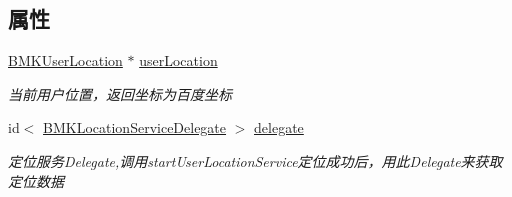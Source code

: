\subsection*{属性}
\begin{DoxyCompactItemize}
\item 
\hypertarget{interface_b_m_k_location_service_a19c6477dc79e94c8e20d7ddf1e52b0c2}{\hyperlink{interface_b_m_k_user_location}{B\+M\+K\+User\+Location} $\ast$ \hyperlink{interface_b_m_k_location_service_a19c6477dc79e94c8e20d7ddf1e52b0c2}{user\+Location}}\label{interface_b_m_k_location_service_a19c6477dc79e94c8e20d7ddf1e52b0c2}

\begin{DoxyCompactList}\small\item\em 当前用户位置，返回坐标为百度坐标 \end{DoxyCompactList}\item 
\hypertarget{interface_b_m_k_location_service_a6a3767cb278c4dba0a59950586b5e37d}{id$<$ \hyperlink{protocol_b_m_k_location_service_delegate-p}{B\+M\+K\+Location\+Service\+Delegate} $>$ \hyperlink{interface_b_m_k_location_service_a6a3767cb278c4dba0a59950586b5e37d}{delegate}}\label{interface_b_m_k_location_service_a6a3767cb278c4dba0a59950586b5e37d}

\begin{DoxyCompactList}\small\item\em 定位服务\+Delegate,调用start\+User\+Location\+Service定位成功后，用此\+Delegate来获取定位数据 \end{DoxyCompactList}\end{DoxyCompactItemize}


